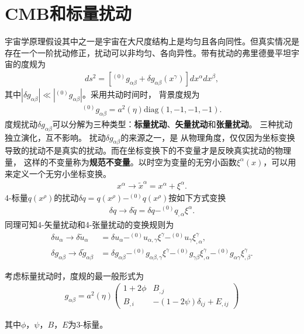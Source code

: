 \section{CMB和标量扰动}

宇宙学原理假设其中之一是宇宙在大尺度结构上是均匀且各向同性。但真实情况是存在一个一阶扰动修正，扰动可以非均匀、各向异性。带有扰动的弗里德曼平坦宇宙的度规为
\begin{align}
  \label{eq:perturbation-metric}
  ds^2=\left[^{(0)}g_{\alpha\beta}+\delta g_{\alpha\beta}(x^{\gamma})
  \right]dx^{\alpha}dx^{\beta},
\end{align}
其中$|\delta g_{\alpha\beta}|\ll|^{(0)}g_{\alpha\beta}|$。采用共动时间时，
背景度规为
\begin{align}
  \label{eq:background-metric}
  ^{(0)}g_{\alpha\beta}=a^2(\eta)\text{diag}(1, -1, -1, -1).
\end{align}
度规扰动$\delta
g_{\alpha\beta}$可以分解为三种类型：\textbf{标量扰动}、\textbf{矢量扰动}和\textbf{张量扰动}。
三种扰动独立演化，互不影响。
扰动$\delta g_{\alpha\beta}$的来源之一，是
从物理角度，仅仅因为坐标变换导致的扰动不是真实的扰动。而在坐标变换下的不变量才是反映真实扰动的物理量，
这样的不变量称为\textbf{规范不变量}。以时空为变量的无穷小函数$\xi^{\alpha}(x)$，可以用来定义一个无穷小坐标变换。
\begin{align}
  \label{eq:coordinate-transformation}
  x^{\alpha} \rightarrow \tilde{x}^{\alpha}=x^{\alpha}+\xi^{\alpha}.
\end{align}
4-标量$q(x^{\rho})$的扰动$\delta
q=q(x^{\rho})-^{(0)}q(x^{\rho})$按如下方式变换
\begin{align}
  \label{eq:scalar-perturbation-transformation}
  \delta q \rightarrow \delta\tilde{q}=\delta q
  -^{(0)}q_{,\alpha}\xi^{\alpha}.
\end{align}
同理可知4-矢量扰动和4-张量扰动的变换规则为
\begin{align}
  \label{eq:vector-perturbation-transformation}
  \delta u_{\alpha} \rightarrow \delta\tilde{u}_{\alpha}&=
  \delta
  u_{\alpha}-^{(0)}u_{\alpha,\gamma}\xi^{\gamma}-^{(0)}u_{\gamma}\xi^{\gamma}_{,\alpha},
  \\
  \label{eq:tensor-perturbation-transformation}
  \delta g_{\alpha\beta}\rightarrow\delta \tilde{g}_{\alpha\beta} &=
  \delta g_{\alpha\beta}-^{(0)}g_{\alpha\beta,\gamma}\xi^{\gamma}
  -^{(0)}g_{\gamma\beta}\xi^{\gamma}_{,\alpha}-^{(0)}g_{\alpha\gamma}\xi^{\gamma}_{,\beta}.
\end{align}

考虑标量扰动时，度规的最一般形式为
\begin{align}
  \label{eq:scalar-metric-perturbation}
  g_{\alpha\beta}=a^2(\eta)
  \begin{pmatrix}
    1 + 2\phi & B_{,j} \\
    B_{,i} & -(1-2\psi)\delta_{ij}+E_{,ij}
  \end{pmatrix}
\end{align}

其中$\phi$，$\psi$，$B$，$E$为3-标量。
